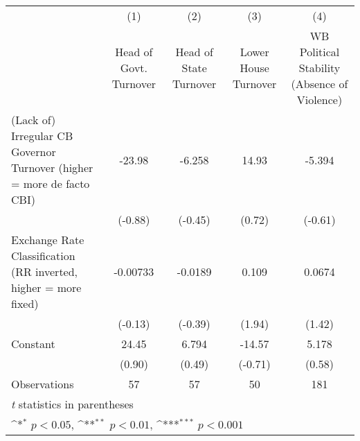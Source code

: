 {
\def\sym#1{\ifmmode^{#1}\else\(^{#1}\)\fi}
\begin{tabular*}{\linewidth}{@{\hskip\tabcolsep\extracolsep\fill}l*{4}{c}}
\hline\hline
                &\multicolumn{1}{c}{(1)}&\multicolumn{1}{c}{(2)}&\multicolumn{1}{c}{(3)}&\multicolumn{1}{c}{(4)}\\
                &\multicolumn{1}{c}{Head of Govt. Turnover}&\multicolumn{1}{c}{Head of State Turnover}&\multicolumn{1}{c}{Lower House Turnover}&\multicolumn{1}{c}{WB Political Stability (Absence of Violence)}\\
\hline
(Lack of) Irregular CB Governor Turnover (higher = more de facto CBI)&   -23.98         &   -6.258         &    14.93         &   -5.394         \\
                &  (-0.88)         &  (-0.45)         &   (0.72)         &  (-0.61)         \\
[1em]
Exchange Rate Classification (RR inverted, higher = more fixed)& -0.00733         &  -0.0189         &    0.109         &   0.0674         \\
                &  (-0.13)         &  (-0.39)         &   (1.94)         &   (1.42)         \\
[1em]
Constant        &    24.45         &    6.794         &   -14.57         &    5.178         \\
                &   (0.90)         &   (0.49)         &  (-0.71)         &   (0.58)         \\
\hline
Observations    &       57         &       57         &       50         &      181         \\
\hline\hline
\multicolumn{5}{l}{\footnotesize \textit{t} statistics in parentheses}\\
\multicolumn{5}{l}{\footnotesize \sym{*} \(p<0.05\), \sym{**} \(p<0.01\), \sym{***} \(p<0.001\)}\\
\end{tabular*}
}
